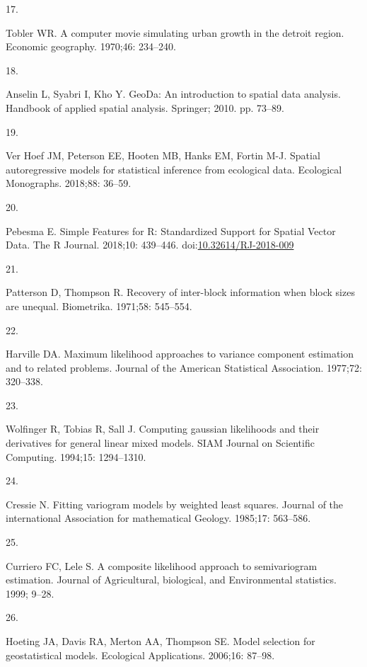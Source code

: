 \documentclass[10pt,letterpaper]{article}
\newlength{\cslhangindent}
\newlength{\csllabelwidth}
\newlength{\cslentryspacingunit} %
\newenvironment{CSLReferences}[2] %
 {%
  \setlength{\parindent}{0pt}
  \ifodd #1
  \let\oldpar\par
  \def\par{\hangindent=\cslhangindent\oldpar}
  \fi
  \setlength{\parskip}{#2\cslentryspacingunit}
 }%
 {}
\newcommand{\CSLLeftMargin}[1]{\parbox[t]{\csllabelwidth}{#1}}
\newcommand{\CSLRightInline}[1]{\parbox[t]{\linewidth - \csllabelwidth}{#1}\break}
\begin{document}
\begin{CSLReferences}{0}{0}
\leavevmode\hypertarget{ref-tobler1970computer}{}%
\CSLLeftMargin{17. }
\CSLRightInline{Tobler WR. A computer movie simulating urban growth in
the detroit region. Economic geography. 1970;46: 234--240. }

\leavevmode\hypertarget{ref-anselin2010geoda}{}%
\CSLLeftMargin{18. }
\CSLRightInline{Anselin L, Syabri I, Kho Y. GeoDa: An introduction to
spatial data analysis. Handbook of applied spatial analysis. Springer;
2010. pp. 73--89. }

\leavevmode\hypertarget{ref-ver2018spatial}{}%
\CSLLeftMargin{19. }
\CSLRightInline{Ver Hoef JM, Peterson EE, Hooten MB, Hanks EM, Fortin
M-J. Spatial autoregressive models for statistical inference from
ecological data. Ecological Monographs. 2018;88: 36--59. }

\leavevmode\hypertarget{ref-pebesma2018sf}{}%
\CSLLeftMargin{20. }
\CSLRightInline{Pebesma E. {Simple Features for R: Standardized Support
for Spatial Vector Data}. {The R Journal}. 2018;10: 439--446.
doi:\href{https://doi.org/10.32614/RJ-2018-009}{10.32614/RJ-2018-009}}

\leavevmode\hypertarget{ref-patterson1971recovery}{}%
\CSLLeftMargin{21. }
\CSLRightInline{Patterson D, Thompson R. Recovery of inter-block
information when block sizes are unequal. Biometrika. 1971;58: 545--554.
}

\leavevmode\hypertarget{ref-harville1977maximum}{}%
\CSLLeftMargin{22. }
\CSLRightInline{Harville DA. Maximum likelihood approaches to variance
component estimation and to related problems. Journal of the American
Statistical Association. 1977;72: 320--338. }

\leavevmode\hypertarget{ref-wolfinger1994computing}{}%
\CSLLeftMargin{23. }
\CSLRightInline{Wolfinger R, Tobias R, Sall J. Computing gaussian
likelihoods and their derivatives for general linear mixed models. SIAM
Journal on Scientific Computing. 1994;15: 1294--1310. }

\leavevmode\hypertarget{ref-cressie1985fitting}{}%
\CSLLeftMargin{24. }
\CSLRightInline{Cressie N. Fitting variogram models by weighted least
squares. Journal of the international Association for mathematical
Geology. 1985;17: 563--586. }

\leavevmode\hypertarget{ref-curriero1999composite}{}%
\CSLLeftMargin{25. }
\CSLRightInline{Curriero FC, Lele S. A composite likelihood approach to
semivariogram estimation. Journal of Agricultural, biological, and
Environmental statistics. 1999; 9--28. }

\leavevmode\hypertarget{ref-hoeting2006model}{}%
\CSLLeftMargin{26. }
\CSLRightInline{Hoeting JA, Davis RA, Merton AA, Thompson SE. Model
selection for geostatistical models. Ecological Applications. 2006;16:
87--98. }


\end{CSLReferences}
\end{document}
